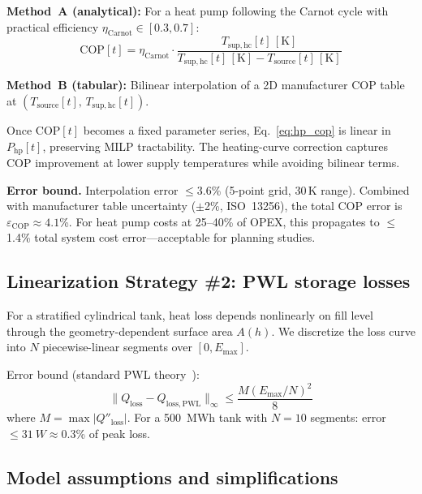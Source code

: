 \documentclass[a4paper,fleqn]{cas-dc}
\begin{document}
\textbf{Method~A (analytical):} For a heat pump following the Carnot cycle with practical efficiency $\eta_\mathrm{Carnot} \in [0.3, 0.7]$:
\begin{equation}
\mathrm{COP}[t] = \eta_\mathrm{Carnot} \cdot \frac{T_{\mathrm{sup,hc}}[t]\,[\mathrm{K}]}{T_{\mathrm{sup,hc}}[t]\,[\mathrm{K}] - T_\mathrm{source}[t]\,[\mathrm{K}]}
\label{eq:cop_analytical}
\end{equation}

\textbf{Method~B (tabular):} Bilinear interpolation of a 2D manufacturer COP table at $(T_\mathrm{source}[t],\, T_{\mathrm{sup,hc}}[t])$.

Once $\mathrm{COP}[t]$ becomes a fixed parameter series, Eq.~\eqref{eq:hp_cop} is linear in $P_\mathrm{hp}[t]$, preserving MILP tractability. The heating-curve correction captures COP improvement at lower supply temperatures while avoiding bilinear terms.

\textbf{Error bound.} Interpolation error $\leq 3.6$\% (5-point grid, 30\,K range). Combined with manufacturer table uncertainty ($\pm$2\%, ISO~13256), the total COP error is $\varepsilon_\mathrm{COP} \approx 4.1$\%. For heat pump costs at 25--40\% of OPEX, this propagates to $\leq$1.4\% total system cost error---acceptable for planning studies.

\subsection{Linearization Strategy \#2: PWL storage losses}\label{sec:linearization_storage}

For a stratified cylindrical tank, heat loss depends nonlinearly on fill level through the geometry-dependent surface area $A(h)$. We discretize the loss curve into $N$ piecewise-linear segments over $[0, E_\mathrm{max}]$.

Error bound (standard PWL theory~\citep{Rebennack2016}):
\begin{equation}
\|Q_\mathrm{loss} - Q_\mathrm{loss,PWL}\|_\infty \leq \frac{M (E_\mathrm{max}/N)^2}{8}
\label{eq:pwl_error}
\end{equation}
where $M = \max |Q''_\mathrm{loss}|$. For a \SI{500}{MWh} tank with $N = 10$ segments: error $\leq \SI{31}{W} \approx 0.3$\% of peak loss.

\subsection{Model assumptions and simplifications}\label{sec:assumptions}
\end{document}
